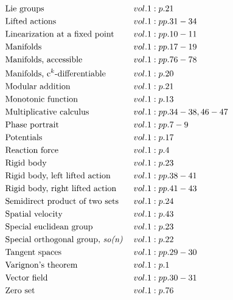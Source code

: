 \documentclass[a4paper]{article}
\begin{document}
\begin{align*}
&\text{Lie groups} \;&& vol. 1: p. 21\\
&\text{Lifted actions} \;&& vol. 1: pp. 31-34\\
&\text{Linearization at a fixed point} \;&& vol. 1: pp. 10-11\\
&\text{Manifolds} \;&& vol. 1: pp. 17-19\\
&\text{Manifolds, accessible} \;&& vol. 1: pp. 76-78\\
&\text{Manifolds, c$^k$-differentiable} \;&& vol. 1: p. 20\\
&\text{Modular addition} \;&& vol. 1: p. 21\\
&\text{Monotonic function} \;&& vol. 1: p. 13\\
&\text{Multiplicative calculus} \;&& vol. 1: pp. 34-38, 46-47\\
&\text{Phase portrait} \;&& vol. 1: pp. 7-9\\
&\text{Potentials} \;&& vol. 1: p. 17\\
&\text{Reaction force} \;&& vol. 1: p. 4\\
&\text{Rigid body} \;&& vol. 1: p. 23\\
&\text{Rigid body, left lifted action} \;&& vol. 1: pp. 38-41\\
&\text{Rigid body, right lifted action} \;&& vol. 1: pp. 41-43\\
&\text{Semidirect product of two sets} \;&& vol. 1: p. 24\\
&\text{Spatial velocity} \;&& vol. 1: p. 43\\
&\text{Special euclidean group} \;&& vol. 1: p. 23\\
&\text{Special orthogonal group, \emph{so(n)}} \;&& vol. 1: p. 22\\
&\text{Tangent spaces} \;&& vol. 1: pp. 29-30\\
&\text{Varignon's theorem} \;&& vol. 1: p. 1\\
&\text{Vector field} \;&& vol. 1: pp. 30-31\\
&\text{Zero set} \;&& vol. 1: p. 76\\
\end{align*} 
\end{document}
